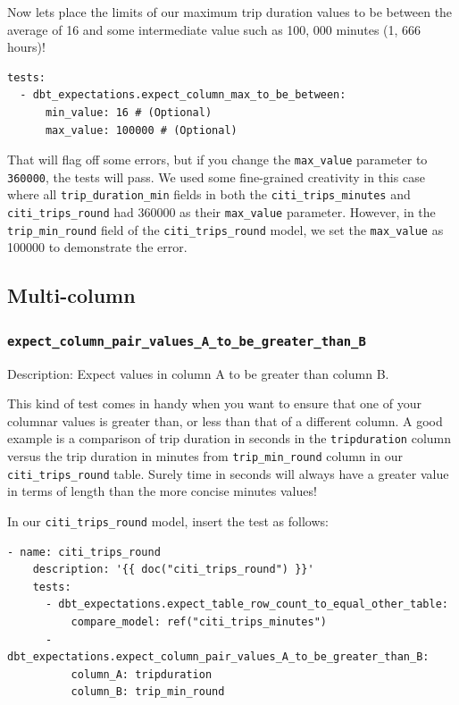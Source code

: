 \documentclass[
]{book}
\begin{document}
Now lets place the limits of our maximum trip duration values to be between the average of 16 and some intermediate value such as 100, 000 minutes (1, 666 hours)!

\begin{verbatim}
tests:
  - dbt_expectations.expect_column_max_to_be_between:
      min_value: 16 # (Optional)
      max_value: 100000 # (Optional)
\end{verbatim}

That will flag off some errors, but if you change the \texttt{max\_value} parameter to \texttt{360000}, the tests will pass. We used some fine-grained creativity in this case where all \texttt{trip\_duration\_min} fields in both the \texttt{citi\_trips\_minutes} and \texttt{citi\_trips\_round} had 360000 as their \texttt{max\_value} parameter. However, in the \texttt{trip\_min\_round} field of the \texttt{citi\_trips\_round} model, we set the \texttt{max\_value} as 100000 to demonstrate the error.

\hypertarget{multi-column}{%
\subsection{Multi-column}\label{multi-column}}

\hypertarget{expect_column_pair_values_a_to_be_greater_than_b}{%
\subsubsection{\texorpdfstring{\texttt{expect\_column\_pair\_values\_A\_to\_be\_greater\_than\_B}}{expect\_column\_pair\_values\_A\_to\_be\_greater\_than\_B}}\label{expect_column_pair_values_a_to_be_greater_than_b}}

Description: Expect values in column A to be greater than column B.

This kind of test comes in handy when you want to ensure that one of your columnar values is greater than, or less than that of a different column. A good example is a comparison of trip duration in seconds in the \texttt{tripduration} column versus the trip duration in minutes from \texttt{trip\_min\_round} column in our \texttt{citi\_trips\_round} table. Surely time in seconds will always have a greater value in terms of length than the more concise minutes values!

In our \texttt{citi\_trips\_round} model, insert the test as follows:

\begin{verbatim}
- name: citi_trips_round
    description: '{{ doc("citi_trips_round") }}'
    tests:
      - dbt_expectations.expect_table_row_count_to_equal_other_table:
          compare_model: ref("citi_trips_minutes")
      - dbt_expectations.expect_column_pair_values_A_to_be_greater_than_B:
          column_A: tripduration
          column_B: trip_min_round
\end{verbatim}
\end{document}
